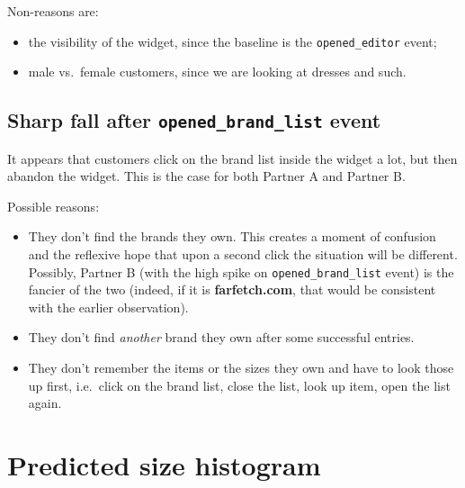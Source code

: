 \documentclass[12pt,a4paper]{article}
\begin{document}
    
    Non-reasons are:
    \begin{itemize}
    \item
        the visibility of the widget,
        since the baseline is the \verb|opened_editor| event;
    \item
        male vs.~female customers, 
        since we are looking at dresses and such.
    \end{itemize}

    
    \subsection{Sharp fall after \texttt{opened\_brand\_list} event}
    
    It appears that customers 
    click on the brand list inside the widget a lot,
    but then abandon the widget.
    This is the case for both Partner A and Partner B.
    
    Possible reasons:
    
    \begin{itemize}
    \item
        They don't find the brands they own.
        This creates a moment of confusion
        and the reflexive hope that 
        upon a second click
        the situation will be different.
        Possibly,
        Partner B
        (with the high spike on \verb|opened_brand_list| event)
        is the fancier of the two
        (indeed, if it is \textbf{farfetch.com},
        that would be consistent with the earlier observation).
        
    \item
        They don't find \emph{another} brand they own
        after some successful entries.
    \item
        They don't remember the items or the sizes they own
        and have to look those up first, 
        i.e.~click on the brand list,
        close the list, look up item, open the list again.
    \end{itemize}

    
    \clearpage
    
    \section{Predicted size histogram}
    
\end{document}
